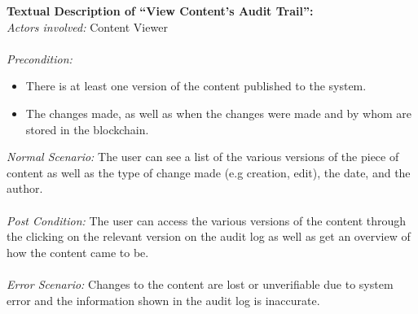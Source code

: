 \newpage
\noindent
\textbf{Textual Description of “View Content's Audit Trail”:} \\
\textit{Actors involved:} Content Viewer \\ \\
\textit{Precondition:} 
	\begin{itemize}
		\item There is at least one version of the content published to the system.
		\item The changes made, as well as when the changes were made and by whom are stored in the blockchain.
	\end{itemize}
\textit{Normal Scenario:} The user can see a list of the various versions of the 
						  piece of content as well as the type of change made 
						  (e.g creation, edit), the date, and the author. \\ \\
\textit{Post Condition:} The user can access the various versions of the content through 
						 the clicking on the relevant version on the audit log as well as 
						 get an overview of how the content came to be. \\ \\
\textit{Error Scenario:} Changes to the content are lost or unverifiable due to system error 
						 and the information shown in the audit log is inaccurate. \\ \\
